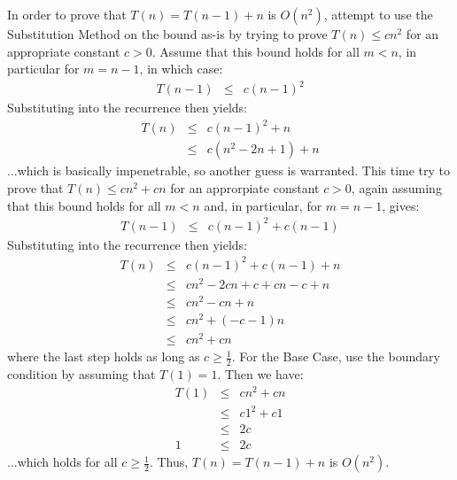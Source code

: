 In order to prove that $T(n) = T(n - 1) + n$ is $O(n^2)$, attempt to use the Substitution Method on the bound as-is by trying to prove $T(n) \leq cn^2$ for an appropriate constant $c > 0$.
Assume that this bound holds for all $m < n$, in particular for $m = n - 1$, in which case:
\begin{eqnarray*}
	T(n - 1) &\leq& c(n - 1)^2
\end{eqnarray*}
Substituting into the recurrence then yields:
\begin{eqnarray*}
	T(n) &\leq& c(n - 1)^2 + n \\
	 &\leq& c(n^2 - 2n + 1) + n
\end{eqnarray*}
...which is basically impenetrable, so another guess is warranted. This time try to prove that $T(n) \leq cn^2 + cn$ for an approrpiate constant $c > 0$, again assuming that this bound holds for all $m < n$ and, in particular, for $m = n - 1$, gives:
\begin{eqnarray*}
	T(n - 1) &\leq& c(n - 1)^2 + c(n - 1)
\end{eqnarray*}
Substituting into the recurrence then yields:
\begin{eqnarray*}
	T(n) &\leq& c(n - 1)^2 + c(n - 1) + n \\
	 &\leq& cn^2 - 2cn + c + cn - c + n \\
	 &\leq& cn^2 - cn + n \\
	 &\leq& cn^2 + (-c - 1)n \\
	 &\leq& cn^2 + cn
\end{eqnarray*}
where the last step holds as long as $c \geq \frac{1}{2}$.
For the Base Case, use the boundary condition by assuming that $T(1) = 1$. Then we have:
\begin{eqnarray*}
	T(1) &\leq& cn^2 + cn \\
	 &\leq& c1^2 + c1 \\
	 &\leq& 2c \\
	1 &\leq& 2c
\end{eqnarray*}
...which holds for all $c \geq \frac{1}{2}$.
Thus, $T(n) = T(n - 1) + n$ is $O(n^2)$.
